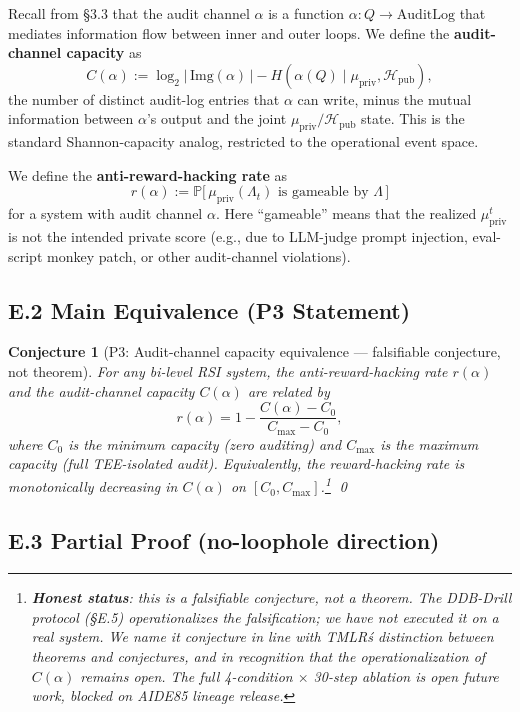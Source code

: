 \documentclass{article}
\newtheorem{conjecture}{Conjecture}
\theoremstyle{definition}
\begin{document}
Recall from \S3.3 that the audit channel $\alpha$ is a function $\alpha : Q \to \text{AuditLog}$ that mediates information flow between inner and outer loops. We define the \textbf{audit-channel capacity} as
\[
C(\alpha) := \log_2 |\,\text{Img}(\alpha)\,| - H(\alpha(Q) \mid \mu_{\text{priv}}, \mathcal{H}_{\text{pub}}),
\]
the number of distinct audit-log entries that $\alpha$ can write, minus the mutual information between $\alpha$'s output and the joint $\mu_{\text{priv}}/\mathcal{H}_{\text{pub}}$ state. This is the standard Shannon-capacity analog, restricted to the operational event space.

We define the \textbf{anti-reward-hacking rate} as
\[
r(\alpha) := \mathbb{P}\big[\,\mu_{\text{priv}}(\Lambda_t) \text{ is gameable by } \Lambda\,\big]
\]
for a system with audit channel $\alpha$. Here ``gameable'' means that the realized $\mu_{\text{priv}}^t$ is not the intended private score (e.g., due to LLM-judge prompt injection, eval-script monkey patch, or other audit-channel violations).

\subsection*{E.2 Main Equivalence (P3 Statement)}

\begin{conjecture}[P3: Audit-channel capacity equivalence --- falsifiable conjecture, not theorem]
For any bi-level RSI system, the anti-reward-hacking rate $r(\alpha)$ and the audit-channel capacity $C(\alpha)$ are related by
\[
r(\alpha) = 1 - \frac{C(\alpha) - C_0}{C_{\max} - C_0},
\]
where $C_0$ is the minimum capacity (zero auditing) and $C_{\max}$ is the maximum capacity (full TEE-isolated audit). Equivalently, the reward-hacking rate is monotonically decreasing in $C(\alpha)$ on $[C_0, C_{\max}]$.\footnote{\textbf{Honest status}: this is a \emph{falsifiable conjecture}, not a theorem. The DDB-Drill protocol (\S E.5) operationalizes the falsification; we have not executed it on a real system. We name it \emph{conjecture} in line with TMLR\'s distinction between theorems and conjectures, and in recognition that the operationalization of $C(\alpha)$ remains open. The full 4-condition $\times$ 30-step ablation is open future work, blocked on AIDE85 lineage release.} \qed
\end{conjecture}

\subsection*{E.3 Partial Proof (no-loophole direction)}
\end{document}
